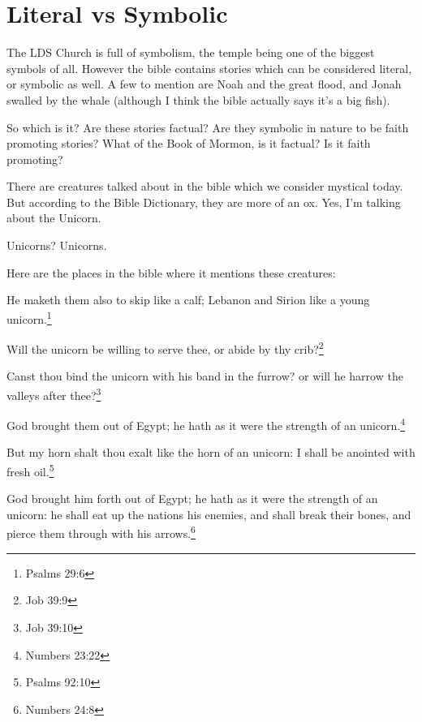 \section{Literal vs Symbolic}

The LDS Church is full of symbolism, the temple being one of the biggest symbols of
all. However the bible contains stories which can be considered literal, or symbolic
as well. A few to mention are Noah and the great flood, and Jonah swalled by the
whale (although I think the bible actually says it's a big fish).

So which is it? Are these stories factual? Are they symbolic in nature to be faith
promoting stories? What of the Book of Mormon, is it factual? Is it faith promoting?

There are creatures talked about in the bible which we consider mystical today. But
according to the Bible Dictionary, they are more of an ox. Yes, I'm talking about the
Unicorn.

Unicorns? Unicorns.

Here are the places in the bible where it mentions these creatures:

\begin{displayquote}
He maketh them also to skip like a calf; Lebanon and Sirion like a young 
unicorn.\footnote{Psalms 29:6}
\end{displayquote}

\begin{displayquote}
Will the unicorn be willing to serve thee, or abide by thy crib?\footnote{Job 39:9}
\end{displayquote}

\begin{displayquote}
Canst thou bind the unicorn with his band in the furrow? or will he harrow the 
valleys after thee?\footnote{Job 39:10} 
\end{displayquote}

\begin{displayquote}
God brought them out of Egypt; he hath as it were the strength of an 
unicorn.\footnote{Numbers 23:22}
\end{displayquote}

\begin{displayquote}
But my horn shalt thou exalt like the horn of an unicorn: I shall be 
anointed with fresh oil.\footnote{Psalms 92:10}
\end{displayquote}

\begin{displayquote}
God brought him forth out of Egypt; he hath as it were the strength of an 
unicorn: he shall eat up the nations his enemies, and shall break their 
bones, and pierce them through with his arrows.\footnote{Numbers 24:8}
\end{displayquote}

